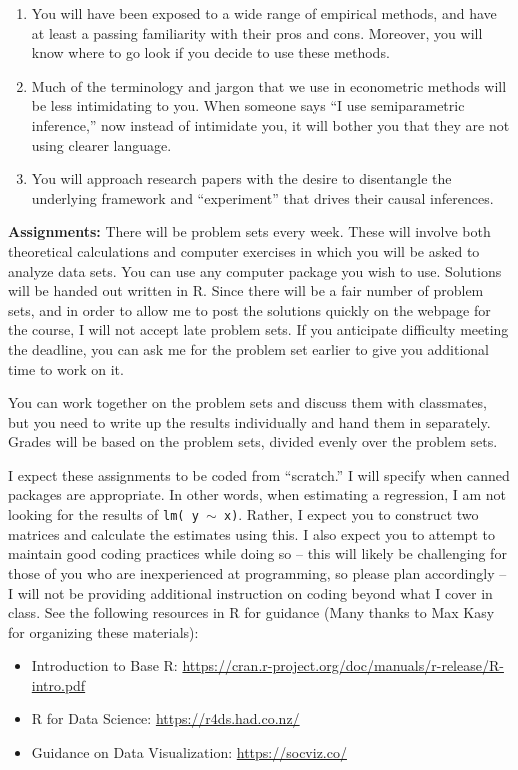 \documentclass[11pt, a4paper]{article}
\begin{document}
\begin{enumerate}
\item You will have been exposed to a wide range of empirical methods,
  and have at least a passing familiarity with their pros and
  cons. Moreover, you will know where to go look if you decide to use
  these methods.
\item Much of the terminology and jargon that we use in econometric
  methods will be less intimidating to you. When someone says ``I use
  semiparametric inference,'' now instead of intimidate you, it will
  bother you that they are not using clearer language.
\item You will approach research papers with the desire to disentangle
  the underlying framework and ``experiment'' that drives their causal
  inferences.
\end{enumerate}

\noindent\textbf{Assignments:}
There will be problem sets every week. These will involve both
theoretical calculations and computer exercises in which you will be
asked to analyze data sets. You can use any computer package you wish
to use. Solutions will be handed out written in R. Since there will be
a fair number of problem sets, and in order to allow me to post the
solutions quickly on the webpage for the course, I will not accept
late problem sets. If you anticipate difficulty meeting the deadline,
you can ask me for the problem set earlier to give you additional time
to work on it.

You can work together on the problem sets and discuss them with
classmates, but you need to write up the results individually and hand
them in separately. Grades will be based on the problem sets, divided
evenly over the problem sets.

I expect these assignments to be coded from ``scratch.'' I will
specify when canned packages are appropriate. In other words, when
estimating a regression, I am not looking for the results of
\texttt{lm( y $\sim$ x)}. Rather, I expect you to construct two
matrices and calculate the estimates using this. I also expect you to
attempt to maintain good coding practices while doing so -- this will
likely be challenging for those of you who are inexperienced at
programming, so please plan accordingly -- I will not be providing
additional instruction on coding beyond what I cover in class.  See
the following resources in R for guidance (Many thanks to Max Kasy for organizing these materials):

\begin{itemize}
\item Introduction to Base R: \url{https://cran.r-project.org/doc/manuals/r-release/R-intro.pdf}
\item R for Data Science: \url{https://r4ds.had.co.nz/}
\item Guidance on Data Visualization: \url{https://socviz.co/}
\end{itemize}
\end{document}
